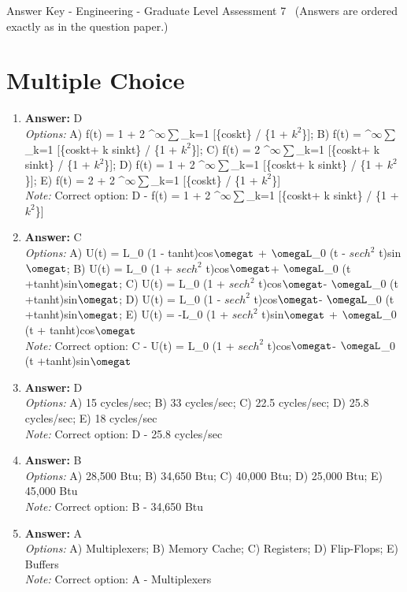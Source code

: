 \documentclass[12pt]{article}
\begin{document}
\begin{center}
Answer Key - Engineering - Graduate Level Assessment 7 \
\small (Answers are ordered exactly as in the question paper.)
\end{center}

\section*{Multiple Choice}
\begin{enumerate}[label=\arabic*.]
\item \textbf{Answer:} D
\\ \textit{Options:} A) f(t) = 1 + 2 ^\ensuremath{\infty}\ensuremath{\sum}\_k=1 [\{coskt\} / \{1 + $k^2$\}]; B) f(t) = ^\ensuremath{\infty}\ensuremath{\sum}\_k=1 [\{coskt+ k sinkt\} / \{1 + $k^2$\}]; C) f(t) = 2 ^\ensuremath{\infty}\ensuremath{\sum}\_k=1 [\{coskt+ k sinkt\} / \{1 + $k^2$\}]; D) f(t) = 1 + 2 ^\ensuremath{\infty}\ensuremath{\sum}\_k=1 [\{coskt+ k sinkt\} / \{1 + $k^2$\}]; E) f(t) = 2 + 2 ^\ensuremath{\infty}\ensuremath{\sum}\_k=1 [\{coskt\} / \{1 + $k^2$\}]
\\ \textit{Note:} Correct option: D - f(t) = 1 + 2 ^\ensuremath{\infty}\ensuremath{\sum}\_k=1 [\{coskt+ k sinkt\} / \{1 + $k^2$\}]
\item \textbf{Answer:} C
\\ \textit{Options:} A) U(t) = L\_0 (1 - tanht)cos\ensuremath{\omegat} + \ensuremath{\omegaL}\_0 (t - $sech^2$ t)sin\ensuremath{\omegat}; B) U(t) = L\_0 (1 + $sech^2$ t)cos\ensuremath{\omegat}+ \ensuremath{\omegaL}\_0 (t +tanht)sin\ensuremath{\omegat}; C) U(t) = L\_0 (1 + $sech^2$ t)cos\ensuremath{\omegat}- \ensuremath{\omegaL}\_0 (t +tanht)sin\ensuremath{\omegat}; D) U(t) = L\_0 (1 - $sech^2$ t)cos\ensuremath{\omegat}- \ensuremath{\omegaL}\_0 (t +tanht)sin\ensuremath{\omegat}; E) U(t) = -L\_0 (1 + $sech^2$ t)sin\ensuremath{\omegat} + \ensuremath{\omegaL}\_0 (t + tanht)cos\ensuremath{\omegat}
\\ \textit{Note:} Correct option: C - U(t) = L\_0 (1 + $sech^2$ t)cos\ensuremath{\omegat}- \ensuremath{\omegaL}\_0 (t +tanht)sin\ensuremath{\omegat}
\item \textbf{Answer:} D
\\ \textit{Options:} A) 15 cycles/sec; B) 33 cycles/sec; C) 22.5 cycles/sec; D) 25.8 cycles/sec; E) 18 cycles/sec
\\ \textit{Note:} Correct option: D - 25.8 cycles/sec
\item \textbf{Answer:} B
\\ \textit{Options:} A) 28,500 Btu; B) 34,650 Btu; C) 40,000 Btu; D) 25,000 Btu; E) 45,000 Btu
\\ \textit{Note:} Correct option: B - 34,650 Btu
\item \textbf{Answer:} A
\\ \textit{Options:} A) Multiplexers; B) Memory Cache; C) Registers; D) Flip-Flops; E) Buffers
\\ \textit{Note:} Correct option: A - Multiplexers
\end{enumerate}
\end{document}
